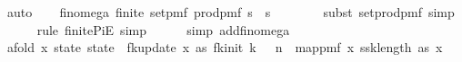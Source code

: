 \begin{isabellebody}
\ auto\isanewline
\ \ \isamarkupfalse%
\ fin{\isacharunderscore}{\kern0pt}omega{\isacharunderscore}{\kern0pt}{}{\isacharcolon}{\kern0pt}\ {\isachardoublequoteopen}finite\ {\isacharparenleft}{\kern0pt}set{\isacharunderscore}{\kern0pt}pmf\ {\isacharparenleft}{\kern0pt}{\isacharparenleft}{\kern0pt}prod{\isacharunderscore}{\kern0pt}pmf\ {\isacharparenleft}{\kern0pt}{\isacharbraceleft}{\kern0pt}{}{\isachardot}{\kern0pt}{\isachardot}{\kern0pt}{\isacharless}{\kern0pt}s\ {\isasymtimes}\ {\isacharbraceleft}{\kern0pt}{}{\isachardot}{\kern0pt}{\isachardot}{\kern0pt}{\isacharless}{\kern0pt}s\ {\isacharparenleft}{\kern0pt}{\isasymlambda}{\isacharunderscore}{\kern0pt}{\isachardot}{\kern0pt}\ {\isasymOmega}{\isacharparenright}{\kern0pt}{\isacharparenright}{\kern0pt}{\isacharparenright}{\kern0pt}{\isacharparenright}{\kern0pt}{\isachardoublequoteclose}\isanewline
\ \ \ \ \isamarkupfalse%
\ {\isacharparenleft}{\kern0pt}subst\ set{\isacharunderscore}{\kern0pt}prod{\isacharunderscore}{\kern0pt}pmf{\isacharcomma}{\kern0pt}\ simp{\isacharparenright}{\kern0pt}\isanewline
\ \ \ \ \isamarkupfalse%
\ {\isacharparenleft}{\kern0pt}rule\ finite{\isacharunderscore}{\kern0pt}PiE{\isacharcomma}{\kern0pt}\ simp{\isacharparenright}{\kern0pt}\isanewline
\ \ \ \ \isamarkupfalse%
\ {\isacharparenleft}{\kern0pt}simp\ add{\isacharcolon}{\kern0pt}fin{\isacharunderscore}{\kern0pt}omega{\isacharparenright}{\kern0pt}\isanewline
\isanewline
\ \ \isamarkupfalse%
\ a{\isacharcolon}{\kern0pt}{\isachardoublequoteopen}fold\ {\isacharparenleft}{\kern0pt}{\isasymlambda}x\ state{\isachardot}{\kern0pt}\ state\ {\isasymbind}\ fk{\isacharunderscore}{\kern0pt}update\ x{\isacharparenright}{\kern0pt}\ as\ {\isacharparenleft}{\kern0pt}fk{\isacharunderscore}{\kern0pt}init\ k\ {\isasymdelta}\ {\isasymepsilon}\ n{\isacharparenright}{\kern0pt}\ {\isacharequal}{\kern0pt}\ map{\isacharunderscore}{\kern0pt}pmf\ {\isacharparenleft}{\kern0pt}{\isasymlambda}x{\isachardot}{\kern0pt}\ {\isacharparenleft}{\kern0pt}ssk{\isacharcomma}{\kern0pt}length\ as{\isacharcomma}{\kern0pt}\ x{\isacharparenright}{\kern0pt}{\isacharparenright}{\kern0pt}\ \isanewline

\end{isabellebody}
